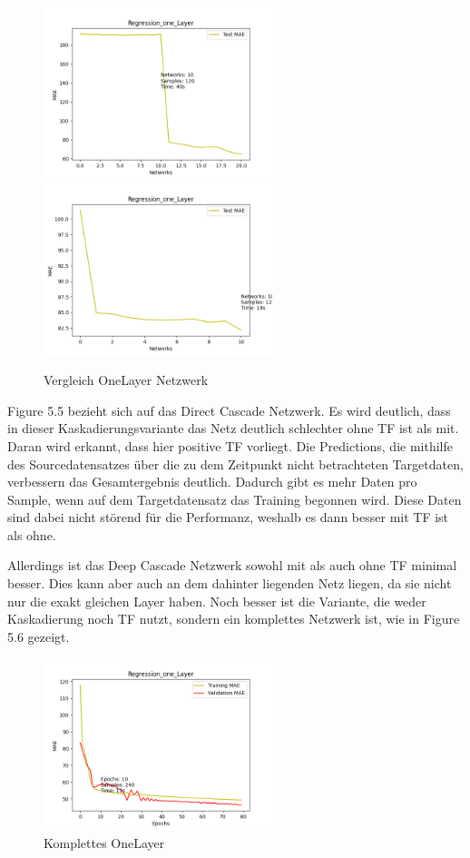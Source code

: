 \begin{figure}[htpb]
    \includegraphics[height=5cm]{../../Plots/ba_plots/regression_small/onelayer_ts.png}
    \includegraphics[height=5cm]{../../Plots/ba_plots/regression_small/woonelayer_ts.png}
    \caption{\label{fig:smallonl} Vergleich OneLayer Netzwerk}
\end{figure}

Figure 5.5 bezieht sich auf das Direct Cascade Netzwerk. Es wird deutlich, dass in dieser Kaskadierungsvariante das Netz deutlich schlechter 
ohne TF ist als mit. Daran wird erkannt, dass hier positive TF vorliegt. Die Predictions, die mithilfe des Sourcedatensatzes über die 
zu dem Zeitpunkt nicht betrachteten Targetdaten, verbessern das Gesamtergebnis deutlich. Dadurch gibt es mehr Daten pro Sample, wenn auf dem 
Targetdatensatz das Training begonnen wird. Diese Daten sind dabei nicht störend für die Performanz, weshalb es dann besser mit TF ist als ohne. 

Allerdings ist das Deep Cascade Netzwerk sowohl mit als auch ohne TF minimal besser. Dies kann aber auch 
an dem dahinter liegenden Netz liegen, da sie nicht nur die exakt gleichen Layer haben. 
Noch besser ist die Variante, 
die weder Kaskadierung noch TF nutzt, sondern ein komplettes Netzwerk ist, wie in Figure 5.6 gezeigt. 

\begin{figure}
    \centering
    \includegraphics[height=5cm]{../../Plots/ba_plots/regression_small/onelayer_complete.png}
    \caption{\label{fig:smallonlcomp} Komplettes OneLayer}
\end{figure}

